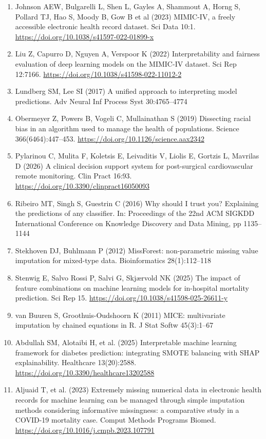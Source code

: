\documentclass[12pt,a4paper]{report}
\begin{document}
\begin{enumerate}
  \item Johnson AEW, Bulgarelli L, Shen L, Gayles A, Shammout A, Horng S, Pollard TJ, Hao S, Moody B, Gow B et al (2023) MIMIC-IV, a freely accessible electronic health record dataset. Sci Data 10:1. \url{https://doi.org/10.1038/s41597-022-01899-x}
  \item Liu Z, Capurro D, Nguyen A, Verspoor K (2022) Interpretability and fairness evaluation of deep learning models on the MIMIC-IV dataset. Sci Rep 12:7166. \url{https://doi.org/10.1038/s41598-022-11012-2}
  \item Lundberg SM, Lee SI (2017) A unified approach to interpreting model predictions. Adv Neural Inf Process Syst 30:4765--4774
  \item Obermeyer Z, Powers B, Vogeli C, Mullainathan S (2019) Dissecting racial bias in an algorithm used to manage the health of populations. Science 366(6464):447--453. \url{https://doi.org/10.1126/science.aax2342}
  \item Pylarinou C, Mulita F, Koletsis E, Leivaditis V, Liolis E, Gortzis L, Mavrilas D (2026) A clinical decision support system for post-surgical cardiovascular remote monitoring. Clin Pract 16:93. \url{https://doi.org/10.3390/clinpract16050093}
  \item Ribeiro MT, Singh S, Guestrin C (2016) Why should I trust you? Explaining the predictions of any classifier. In: Proceedings of the 22nd ACM SIGKDD International Conference on Knowledge Discovery and Data Mining, pp 1135--1144
  \item Stekhoven DJ, Buhlmann P (2012) MissForest: non-parametric missing value imputation for mixed-type data. Bioinformatics 28(1):112--118
  \item Stenwig E, Salvo Rossi P, Salvi G, Skjærvold NK (2025) The impact of feature combinations on machine learning models for in-hospital mortality prediction. Sci Rep 15. \url{https://doi.org/10.1038/s41598-025-26611-y}
  \item van Buuren S, Groothuis-Oudshoorn K (2011) MICE: multivariate imputation by chained equations in R. J Stat Softw 45(3):1--67
  \item Abdullah SM, Alotaibi H, et al. (2025) Interpretable machine learning framework for diabetes prediction: integrating SMOTE balancing with SHAP explainability. Healthcare 13(20):2588. \url{https://doi.org/10.3390/healthcare13202588}
  \item Aljuaid T, et al. (2023) Extremely missing numerical data in electronic health records for machine learning can be managed through simple imputation methods considering informative missingness: a comparative study in a COVID-19 mortality case. Comput Methods Programs Biomed. \url{https://doi.org/10.1016/j.cmpb.2023.107791}

\end{enumerate}
\end{document}
